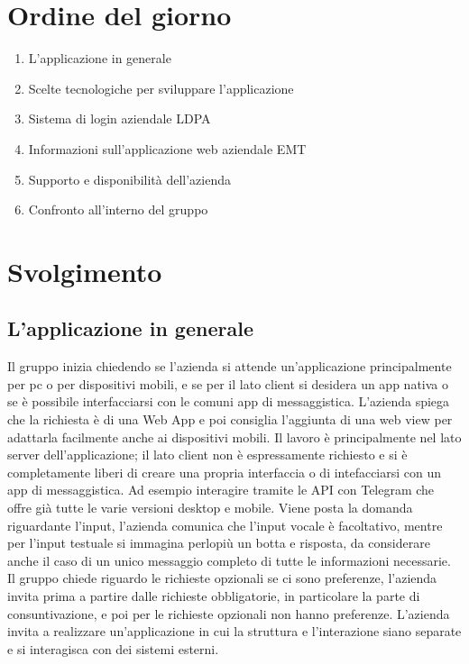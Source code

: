 \documentclass[12pt, a4paper,table]{article}
\begin{document}
	\section{Ordine del giorno}
	\begin{enumerate}
		\item L'applicazione in generale
		\item Scelte tecnologiche per sviluppare l'applicazione
		\item Sistema di login aziendale LDPA
		\item Informazioni sull'applicazione web aziendale EMT
		\item Supporto e disponibilità dell'azienda
		\item Confronto all'interno del gruppo
	\end{enumerate}
	\newpage

	\section{Svolgimento}
		\subsection{L'applicazione in generale}
		Il gruppo inizia chiedendo se l'azienda si attende un'applicazione principalmente 
		per pc o per dispositivi mobili, e se per il lato client si desidera un app nativa 
		o se è possibile interfacciarsi con le comuni app di messaggistica. \newline
		L'azienda spiega che la richiesta è di una Web App e poi consiglia l'aggiunta di una 
		web view per adattarla facilmente anche ai dispositivi mobili. Il lavoro è principalmente 
		nel lato server dell'applicazione; il lato client non è espressamente richiesto e si è 
		completamente liberi di creare una propria interfaccia o di intefacciarsi con un app di 
		messaggistica. Ad esempio interagire tramite le API con Telegram che offre già tutte 
		le varie versioni desktop e mobile.\newline
        Viene posta la domanda riguardante l'input, l'azienda comunica che l'input vocale 
		è facoltativo, mentre per l'input testuale si immagina perlopiù un botta e risposta, 
		da considerare anche il caso di un unico messaggio completo di tutte le informazioni necessarie.\newline
		Il gruppo chiede riguardo le richieste opzionali se ci sono preferenze, l'azienda invita 
		prima a partire dalle richieste obbligatorie, in particolare la parte di consuntivazione, 
		e poi per le richieste opzionali non hanno preferenze.
		L'azienda invita a realizzare un'applicazione in cui la struttura e l'interazione siano
		separate e si interagisca con dei sistemi esterni.
		
\end{document}
